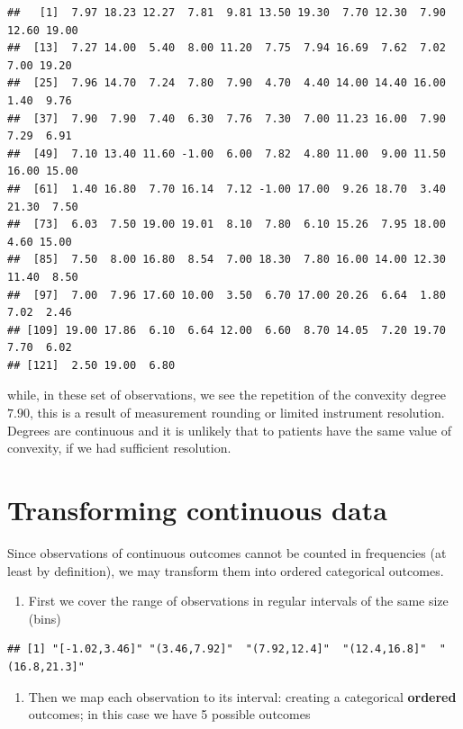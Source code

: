 \documentclass[
]{book}
\providecommand{\tightlist}{%
  \setlength{\itemsep}{0pt}\setlength{\parskip}{0pt}}
\begin{document}
\begin{verbatim}
##   [1]  7.97 18.23 12.27  7.81  9.81 13.50 19.30  7.70 12.30  7.90 12.60 19.00
##  [13]  7.27 14.00  5.40  8.00 11.20  7.75  7.94 16.69  7.62  7.02  7.00 19.20
##  [25]  7.96 14.70  7.24  7.80  7.90  4.70  4.40 14.00 14.40 16.00  1.40  9.76
##  [37]  7.90  7.90  7.40  6.30  7.76  7.30  7.00 11.23 16.00  7.90  7.29  6.91
##  [49]  7.10 13.40 11.60 -1.00  6.00  7.82  4.80 11.00  9.00 11.50 16.00 15.00
##  [61]  1.40 16.80  7.70 16.14  7.12 -1.00 17.00  9.26 18.70  3.40 21.30  7.50
##  [73]  6.03  7.50 19.00 19.01  8.10  7.80  6.10 15.26  7.95 18.00  4.60 15.00
##  [85]  7.50  8.00 16.80  8.54  7.00 18.30  7.80 16.00 14.00 12.30 11.40  8.50
##  [97]  7.00  7.96 17.60 10.00  3.50  6.70 17.00 20.26  6.64  1.80  7.02  2.46
## [109] 19.00 17.86  6.10  6.64 12.00  6.60  8.70 14.05  7.20 19.70  7.70  6.02
## [121]  2.50 19.00  6.80
\end{verbatim}

while, in these set of observations, we see the repetition of the convexity degree \(7.90\), this is a result of measurement rounding or limited instrument resolution. Degrees are continuous and it is unlikely that to patients have the same value of convexity, if we had sufficient resolution.

\hypertarget{transforming-continuous-data}{%
\section{Transforming continuous data}\label{transforming-continuous-data}}

Since observations of continuous outcomes cannot be counted in frequencies (at least by definition), we may transform them into ordered categorical outcomes.

\begin{enumerate}
\def\labelenumi{\arabic{enumi})}
\tightlist
\item
  First we cover the range of observations in regular intervals of the same size (bins)
\end{enumerate}

\begin{verbatim}
## [1] "[-1.02,3.46]" "(3.46,7.92]"  "(7.92,12.4]"  "(12.4,16.8]"  "(16.8,21.3]"
\end{verbatim}

\begin{enumerate}
\def\labelenumi{\arabic{enumi})}
\setcounter{enumi}{1}
\tightlist
\item
  Then we map each observation to its interval: creating a categorical \textbf{ordered} outcomes; in this case we have 5 possible outcomes
\end{enumerate}
\end{document}
